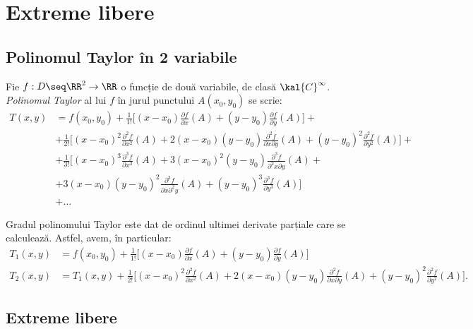 
\chapter{Extreme libere}

\section{Polinomul Taylor în 2 variabile}

Fie $ f : D \seq \RR^2 \to \RR $ o funcție de două variabile,
de clasă $ \kal{C}^\infty $. \emph{Polinomul Taylor} al lui $ f $
în jurul punctului $A(x_0, y_0) $ se scrie:
\begin{align*}
    T(x, y) &= f(x_0, y_0) + \frac{1}{1!} \Big[ (x - x_0) \frac{\partial f}{\partial x}(A) + %
    (y - y_0) \frac{\partial f}{\partial y}(A) \Big] + \\
            &+ \frac{1}{2!} \Big[ (x - x_0)^2 \frac{\partial^2 f}{\partial x^2}(A) + %
                2(x - x_0)(y - y_0) \frac{\partial^2 f}{\partial x \partial y}(A) + %
            (y - y_0)^2 \frac{\partial^2 f}{\partial y^2}(A) \Big] + \\
            &+ \frac{1}{3!} \Big[ (x - x_0)^3 \frac{\partial^3 f}{\partial x^3}(A) + %
                3(x - x_0)^2(y - y_0) \frac{\partial^3 f}{\partial^2 x \partial y}(A) + \\
            &+ 3(x - x_0)(y - y_0)^2 \frac{\partial^3 f}{\partial x \partial^2 y}(A) + %
            (y - y_0)^3 \frac{\partial^3 f}{\partial y^3}(A) \Big] \\
            &+ \dots
\end{align*}

Gradul polinomului Taylor este dat de ordinul ultimei derivate parțiale
care se calculează. Astfel, avem, în particular:
\begin{align*}
  T_1(x, y) &= f(x_0, y_0) + \frac{1}{1!} \Big[ %
      (x - x_0) \frac{\partial f}{\partial x}(A) + %
  (y - y_0) \frac{\partial f}{\partial y}(A) \Big] \\
  T_2(x, y) &= T_1(x, y) + \frac{1}{2!} \Big[ %
      (x - x_0)^2 \frac{\partial^2 f}{\partial x^2}(A) + %
      2(x - x_0)(y - y_0) \frac{\partial^2 f}{\partial x \partial y}(A) + %
  (y - y_0)^2 \frac{\partial^2 f}{\partial y^2}(A) \Big].
\end{align*}


\section{Extreme libere}

